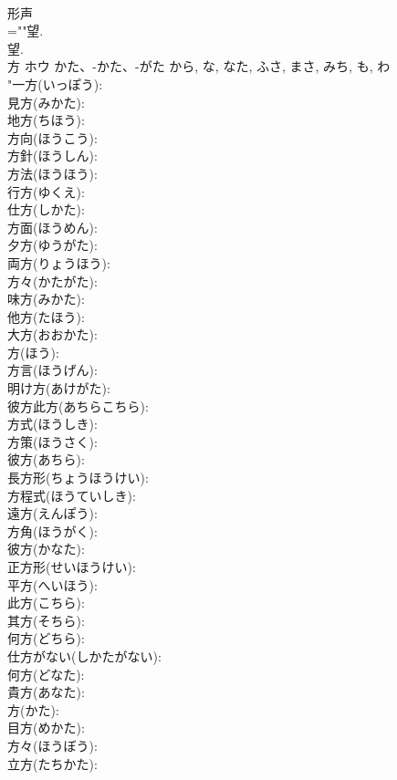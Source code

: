 \documentclass[8pt]{extreport}
\begin{document}
\begin{CJK}{UTF8}{min}
\\	形声 
\\	=""望.
\\	望.
\\	方	ホウ	かた、-かた、-がた	から, な, なた, ふさ, まさ, みち, も, わ	
\\	"一方(いっぽう): 
\\	見方(みかた): 
\\	地方(ちほう): 
\\	方向(ほうこう): 
\\	方針(ほうしん): 
\\	方法(ほうほう): 
\\	行方(ゆくえ): 
\\	仕方(しかた): 
\\	方面(ほうめん): 
\\	夕方(ゆうがた): 
\\	両方(りょうほう): 
\\	方々(かたがた): 
\\	味方(みかた): 
\\	他方(たほう): 
\\	大方(おおかた): 
\\	方(ほう): 
\\	方言(ほうげん): 
\\	明け方(あけがた): 
\\	彼方此方(あちらこちら): 
\\	方式(ほうしき): 
\\	方策(ほうさく): 
\\	彼方(あちら): 
\\	長方形(ちょうほうけい): 
\\	方程式(ほうていしき): 
\\	遠方(えんぽう): 
\\	方角(ほうがく): 
\\	彼方(かなた): 
\\	正方形(せいほうけい): 
\\	平方(へいほう): 
\\	此方(こちら): 
\\	其方(そちら): 
\\	何方(どちら): 
\\	仕方がない(しかたがない): 
\\	何方(どなた): 
\\	貴方(あなた): 
\\	方(かた): 
\\	目方(めかた): 
\\	方々(ほうぼう): 
\\	立方(たちかた): 

\end{CJK}
\end{document}

